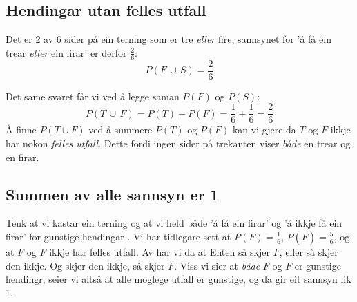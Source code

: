 \subsection{Hendingar utan felles utfall} \vspace{-5pt}
 \qquad
{}
Det er 2 av 6 sider på ein terning som er tre \textsl{eller} fire, sannsynet for 'å få ein trear \textsl{eller} ein firar' er derfor $ \frac{2}{6} $:
\[ P(F\,\cup\,S)=\frac{2}{6} \]

Det same svaret får vi ved å legge saman $P(F)$ og $P(S)$:
\[ P(T\,\cup\,F)=P(T)+P(F)=\frac{1}{6}+\frac{1}{6}=\frac{2}{6} \]
Å finne $ P(T\cup F) $ ved å summere $ P(T) $ og $ P(F) $ kan vi gjere da $ T $ og $ F $ ikkje har nokon \textit{felles utfall}. Dette fordi ingen sider på trekanten viser \textsl{både} en trear og en firar. \regv

\newpage
{}
\newpage
\subsection{Summen av alle sannsyn er 1}
Tenk at vi kastar ein terning og at vi held både 'å få ein firar' og 'å ikkje få ein firar' for gunstige hendingar . Vi har tidlegare sett at $ {P(F)=\frac{1}{6}} $, $ {P(\bar{F})=\frac{5}{6} }$, og at $ F $ og $ \bar{F} $ ikkje har felles utfall. Av  har vi da at
Enten så skjer $ F $, eller så skjer den ikkje. Og skjer den ikkje, så skjer $ \bar{F} $. Viss vi sier at \textsl{både} $ F $ og $ \bar{F} $ er gunstige hendingr, seier vi altså at alle moglege utfall er gunstige, og da gir   eit sannsyn lik 1. \regv
 
